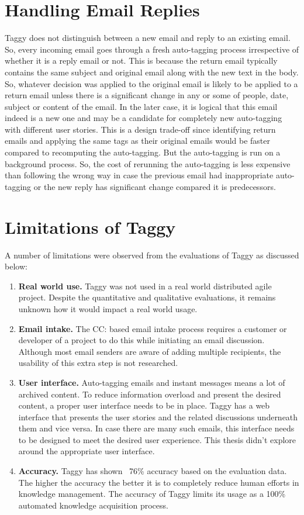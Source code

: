 \section{Handling Email Replies}
Taggy does not distinguish between a new email and reply to an existing email. So, every incoming email goes through a fresh auto-tagging process irrespective of whether it is a reply email or not. This is because the return email typically contains the same subject and original email along with the new text in the body. So, whatever decision was applied to the original email is likely to be applied to a return email unless there is a significant change in any or some of people, date, subject or content of the email. In the later case, it is logical that this email indeed is a new one and may be a candidate for completely new auto-tagging with different user stories. This is a design trade-off since identifying return emails and applying the same tags as their original emails would be faster compared to recomputing the auto-tagging. But the auto-tagging is run on a background process. So, the cost of rerunning the auto-tagging is less expensive than following the wrong way in case the previous email had inappropriate auto-tagging or the new reply has significant change compared it is predecessors.


\section{Limitations of Taggy}
A number of limitations were observed from the evaluations of Taggy as discussed below:

\begin{enumerate}
	\item \textbf{Real world use.} Taggy was not used in a real world distributed agile project. Despite the quantitative and qualitative evaluations, it remains unknown how it would impact a real world usage.
	\item \textbf{Email intake.} The CC: based email intake process requires a customer or developer of a project to do this while initiating an email discussion. Although most email senders are aware of adding multiple recipients, the usability of this extra step is not researched.
	\item \textbf{User interface.} Auto-tagging emails and instant messages means a lot of archived content. To reduce information overload and present the desired content, a proper user interface needs to be in place. Taggy has a web interface that presents the user stories and the related discussions underneath them and vice versa. In case there are many such emails, this interface needs to be designed to meet the desired user experience. This thesis didn't explore around the appropriate user interface.
	\item \textbf{Accuracy.} Taggy has shown ~76\% accuracy based on the evaluation data. The higher the accuracy the better it is to completely reduce human efforts in knowledge management. The accuracy of Taggy limits its usage as a 100\% automated knowledge acquisition process.
\end{enumerate}







